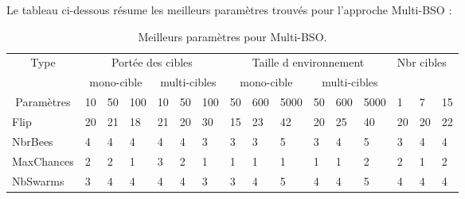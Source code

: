 	\noindent
	Le tableau ci-dessous résume les meilleurs paramètres trouvés pour l'approche Multi-BSO :
	\vspace{-0.3cm}
	\begin{table}[h]
		\begin{tabular}{|l|p{0.3cm}|p{0.3cm}|p{0.3cm}|p{0.3cm}|p{0.3cm}|p{0.3cm}|p{0.5cm}|p{0.5cm}|p{0.6cm}|p{0.5cm}|p{0.5cm}|p{0.6cm}|p{0.35cm}|p{0.35cm}|p{0.35cm}|}
			\hline
			\multicolumn{1}{|c|}{\multirow{2}{*}{Type}} & \multicolumn{6}{c|}{Portée des cibles}                              & \multicolumn{6}{c|}{Taille d environnement}                         & \multicolumn{3}{l|}{\multirow{2}{*}{Nbr cibles}} \\ \cline{2-13}
			\multicolumn{1}{|c|}{}                      & \multicolumn{3}{c|}{mono-cible} & \multicolumn{3}{c|}{multi-cibles} & \multicolumn{3}{c|}{mono-cible} & \multicolumn{3}{c|}{multi-cibles} & \multicolumn{3}{l|}{}                                  \\ \hline
			\multicolumn{1}{|c|}{Paramètres}            & 10       & 50       & 100       & 10        & 50        & 100       & 50       & 600      & 5000      & 50        & 600       & 5000      & 1                & 7                & 15               \\ \hline  \hline
			Flip                                        & 20       & 21       & 18        & 21        & 20        & 30        & 15       & 23       & 42        & 20        & 25        & 40        & 20               & 20               & 22               \\ \hline
			NbrBees                                     & 4        & 4        & 4         & 4         & 4         & 3         & 3        & 3        & 5         & 3         & 4         & 5         & 3                & 4                & 4                \\ \hline
			MaxChances                                  & 2        & 2        & 1         & 3         & 2         & 1         & 1        & 1        & 1         & 1         & 1         & 2         & 2                & 1                & 2                \\ \hline
			NbSwarms                                    & 3        & 4        & 4         & 4         & 4         & 3         & 3        & 4        & 5         & 4         & 4         & 5         & 4                & 4                & 4                \\ \hline
		\end{tabular}
		\caption{Meilleurs paramètres pour Multi-BSO.}
	\end{table}
		
